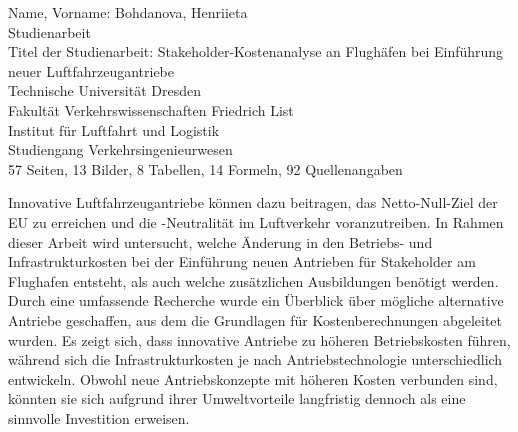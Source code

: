 \newpage
\thispagestyle{empty}
\begin{minipage}[\textheight]{145mm}

\vspace{10mm}

Name, Vorname: Bohdanova, Henriieta\\
Studienarbeit\\

Titel der Studienarbeit: Stakeholder-Kostenanalyse an Flughäfen bei Einführung neuer Luftfahrzeugantriebe\\

Technische Universität Dresden\\
Fakultät Verkehrswissenschaften \glqq Friedrich List\grqq{}\\
Institut für Luftfahrt und Logistik\\

Studiengang Verkehrsingenieurwesen\\
57 Seiten, 13 Bilder, 8 Tabellen, 14 Formeln, 92 Quellenangaben 
		
\vspace{15mm}

\begin{minipage}[\textheight]{145mm}
 
\vspace{10mm}

 
Innovative Luftfahrzeugantriebe können dazu beitragen, das Netto-Null-Ziel der EU zu erreichen und die -Neutralität im Luftverkehr voranzutreiben.
In Rahmen dieser Arbeit wird untersucht, welche Änderung in den Betriebs- und Infrastrukturkosten bei der Einführung neuen Antrieben für Stakeholder am Flughafen entsteht, 
als auch welche zusätzlichen Ausbildungen benötigt werden. Durch eine umfassende Recherche wurde ein Überblick über mögliche alternative Antriebe geschaffen, aus dem die Grundlagen für Kostenberechnungen abgeleitet wurden.
Es zeigt sich, dass innovative Antriebe zu höheren Betriebskosten führen, während sich die Infrastrukturkosten je nach Antriebstechnologie unterschiedlich entwickeln.
Obwohl neue Antriebskonzepte mit höheren Kosten verbunden sind, könnten sie sich aufgrund ihrer Umweltvorteile 
langfristig dennoch als eine sinnvolle Investition erweisen.


 
\end{minipage}\hspace{4cm}



\end{minipage}
\cleardoublepage

